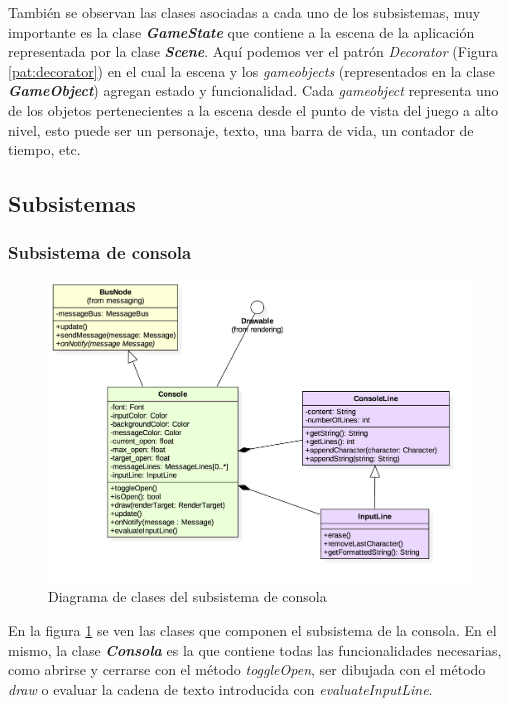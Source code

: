 \bigskip

También se observan las clases asociadas a cada uno de los subsistemas, muy importante es la clase \textbf{\textit{GameState}} que contiene a la escena de la aplicación representada por la clase \textbf{\textit{Scene}}. Aquí podemos ver el patrón \textit{Decorator} (Figura \ref{pat:decorator}) en el cual la escena y los \textit{gameobjects} (representados en la clase \textbf{\textit{GameObject}}) agregan estado y funcionalidad. Cada \textit{gameobject} representa uno de los objetos pertenecientes a la escena desde el punto de vista del juego a alto nivel, esto puede ser un personaje, texto, una barra de vida, un contador de tiempo, etc.


\subsection{Subsistemas}

\subsubsection*{Subsistema de consola}

\begin{figure}
	\centerline{\includegraphics[width=15cm]{otros/UML/png/alld/png/console__diagramaDeClases_console_3.png}}
	\caption{Diagrama de clases del subsistema de consola}
	\label{class:console}
\end{figure}

En la figura \ref{class:console} se ven las clases que componen el subsistema de la consola. En el mismo, la clase \textbf{\textit{Consola}} es la que contiene todas las funcionalidades necesarias, como abrirse y cerrarse con el método \textit{toggleOpen}, ser dibujada con el método \textit{draw} o evaluar la cadena de texto introducida con \textit{evaluateInputLine}.

